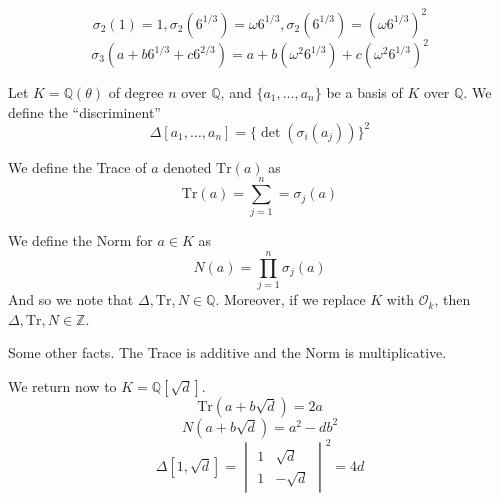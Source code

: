 \documentclass{article}
\begin{document}
\[ \sigma_2(1) = 1, \sigma_2(6^{1/3}) = \omega 6^{1/3}, \sigma_2(6^{1/3} )=
(\omega 6^{1/3})^2 \]
\[ \sigma_3(a+b6^{1/3}+c 6^{2/3}) = a + b(\omega^2 6^{1/3}) + c(\omega^2
6^{1/3})^2 \]

Let $K = \mathbb{Q}(\theta)$ of degree $n$ over $\mathbb{Q}$, and
$\{a_1,\ldots,a_n\}$ be a basis of $K$ over $\mathbb{Q}$. We define the
``discriminent'' 
\[ \Delta[a_1,\ldots,a_n] = \{ \det(\sigma_i(a_j)) \}^2 \]

We define the Trace of $a$ denoted $\text{Tr}(a)$ as
\[ \text{Tr}(a) = \sum_{j=1}^n = \sigma_j(a) \]

We define the Norm for $a \in K$ as
\[ N(a) = \prod_{j=1}^n \sigma_j (a) \]
And so we note that $\Delta, \text{Tr}, N \in \mathbb{Q}$. Moreover, if we
replace $K$ with $\mathcal{O}_k$, then $\Delta, \text{Tr}, N \in \mathbb{Z}$.

Some other facts. The Trace is additive and the Norm is multiplicative. 

We return now to $K = \mathbb{Q}[\sqrt{d}]$. 
\[ \text{Tr}(a + b \sqrt{d}) = 2a \]
\[ N(a + b \sqrt{d}) = a^2 -db^2 \]
\[ \Delta[1, \sqrt{d}] = \begin{vmatrix} 1 & \sqrt{d} \\ 1 & -\sqrt{d}
\end{vmatrix}^2 = 4d \]
\end{document}
